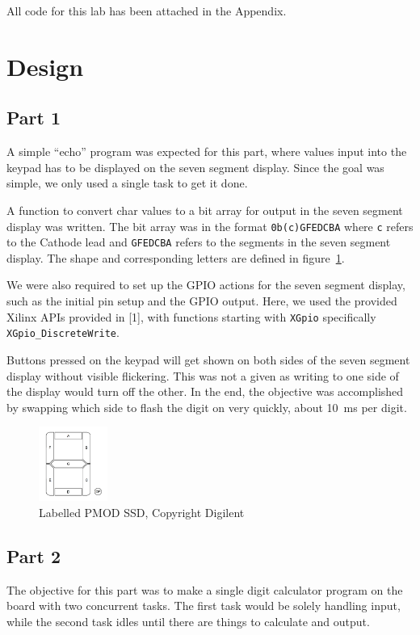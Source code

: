 \documentclass{article}
\begin{document}
All code for this lab has been attached in the Appendix.

\section{Design}
\subsection{Part 1}
A simple ``echo'' program was expected for this part, where values input into the keypad has to be displayed on the seven segment display. Since the goal was simple, we only used a single task to get it done.

A function to convert char values to a bit array for output in the seven segment display was written. The bit array was in the format \verb|0b(c)GFEDCBA| where \verb|c| refers to the Cathode lead and \verb|GFEDCBA| refers to the segments in the seven segment display. The shape and corresponding letters are defined in figure~\ref{fig:ssd_sketch}.

We were also required to set up the GPIO actions for the seven segment display, such as the initial pin setup and the GPIO output. Here, we used the provided Xilinx APIs provided in [1], with functions starting with \verb|XGpio| specifically \verb|XGpio_DiscreteWrite|.

Buttons pressed on the keypad will get shown on both sides of the seven segment display without visible flickering. This was not a given as writing to one side of the display would turn off the other. In the end, the objective was accomplished by swapping which side to flash the digit on very quickly, about \SI{10}{\milli\second} per digit.
\begin{figure}[b]
    \centering
    \includegraphics[width=0.2\textwidth]{ssd_sketch.png}
    \caption{Labelled PMOD SSD, Copyright Digilent}
    \label{fig:ssd_sketch}
\end{figure}
\subsection{Part 2}
The objective for this part was to make a single digit calculator program on the board with two concurrent tasks. The first task would be solely handling input, while the second task idles until there are things to calculate and output.
\end{document}
